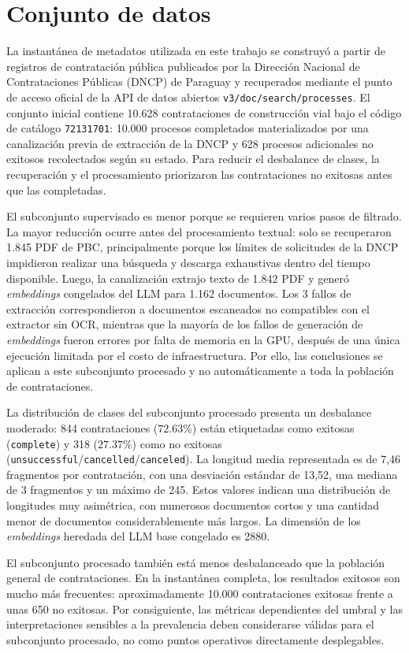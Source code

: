 \section{Conjunto de datos}
La instantánea de metadatos utilizada en este trabajo se construyó a partir de registros de contratación pública publicados por la Dirección Nacional de Contrataciones Públicas (DNCP) de Paraguay y recuperados mediante el punto de acceso oficial de la API de datos abiertos \texttt{v3/doc/search/processes}. El conjunto inicial contiene 10.628 contrataciones de construcción vial bajo el código de catálogo \texttt{72131701}: 10.000 procesos completados materializados por una canalización previa de extracción de la DNCP y 628 procesos adicionales no exitosos recolectados según su estado. Para reducir el desbalance de clases, la recuperación y el procesamiento priorizaron las contrataciones no exitosas antes que las completadas.

El subconjunto supervisado es menor porque se requieren varios pasos de filtrado. La mayor reducción ocurre antes del procesamiento textual: solo se recuperaron 1.845 PDF de PBC, principalmente porque los límites de solicitudes de la DNCP impidieron realizar una búsqueda y descarga exhaustivas dentro del tiempo disponible. Luego, la canalización extrajo texto de 1.842 PDF y generó \textit{embeddings} congelados del LLM para 1.162 documentos. Los 3 fallos de extracción correspondieron a documentos escaneados no compatibles con el extractor sin OCR, mientras que la mayoría de los fallos de generación de \textit{embeddings} fueron errores por falta de memoria en la GPU, después de una única ejecución limitada por el costo de infraestructura. Por ello, las conclusiones se aplican a este subconjunto procesado y no automáticamente a toda la población de contrataciones.

La distribución de clases del subconjunto procesado presenta un desbalance moderado: 844 contrataciones ($72.63\%$) están etiquetadas como exitosas (\texttt{complete}) y 318 ($27.37\%$) como no exitosas (\texttt{unsuccessful}/\texttt{cancelled}/\texttt{canceled}). La longitud media representada es de 7,46 fragmentos por contratación, con una desviación estándar de 13,52, una mediana de 3 fragmentos y un máximo de 245. Estos valores indican una distribución de longitudes muy asimétrica, con numerosos documentos cortos y una cantidad menor de documentos considerablemente más largos. La dimensión de los \textit{embeddings} heredada del LLM base congelado es 2880.

El subconjunto procesado también está menos desbalanceado que la población general de contrataciones. En la instantánea completa, los resultados exitosos son mucho más frecuentes: aproximadamente 10.000 contrataciones exitosas frente a unas 650 no exitosas. Por consiguiente, las métricas dependientes del umbral y las interpretaciones sensibles a la prevalencia deben considerarse válidas para el subconjunto procesado, no como puntos operativos directamente desplegables.

